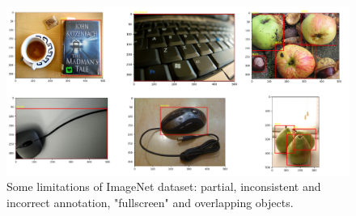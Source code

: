 \begin{figure}[tb]
	\centering
	\includegraphics[width=1.0\hsize]{./figures/generalDifficult}
	\caption{Some limitations of ImageNet dataset: partial, inconsistent and incorrect annotation, "fullscreen" and overlapping objects.}
	\label{fig:generalDifficult}
\end{figure}



